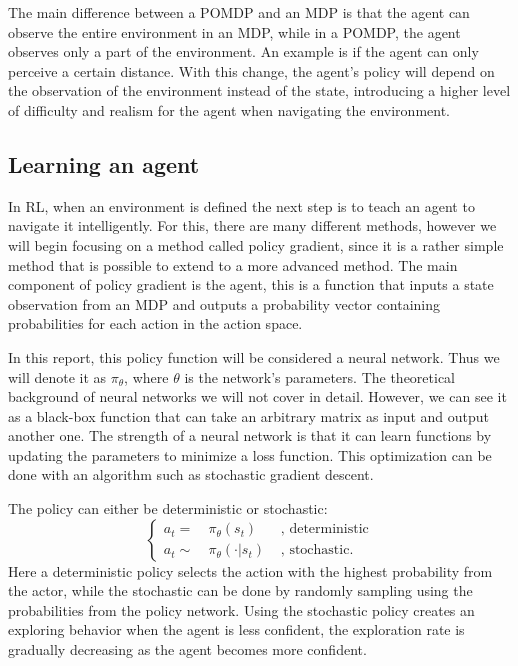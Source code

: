 \documentclass[12pt,A4]{report}
\theoremstyle{definition}
\begin{document}
The main difference between a POMDP and an MDP is that the agent can observe the entire environment in an MDP, while in a POMDP, the agent observes only a part of the environment. An example is if the agent can only perceive a certain distance. With this change, the agent's policy will depend on the observation of the environment instead of the state, introducing a higher level of difficulty and realism for the agent when navigating the environment. 


\subsection{Learning an agent}

In RL, when an environment is defined the next step is to teach an agent to navigate it intelligently. For this, there are many different methods, however we will begin focusing on a method called policy gradient, since it is a rather simple method that is possible to extend to a more advanced method. The main component of policy gradient is the agent, this is a function that inputs a state observation from an MDP and outputs a probability vector containing probabilities for each action in the action space. 

In this report, this policy function will be considered a neural network. Thus we will denote it as $\pi_\theta$, where $\theta$ is the network's parameters. The theoretical background of neural networks we will not cover in detail. However, we can see it as a black-box function that can take an arbitrary matrix as input and output another one. The strength of a neural network is that it can learn functions by updating the parameters to minimize a loss function. This optimization can be done with an algorithm such as stochastic gradient descent.  

The policy can either be deterministic or stochastic:
\begin{equation*}
  \left\{ 
  \begin{aligned}
    a_t =& \ \pi_\theta(s_t)& \text{ , deterministic} \\
    a_t \sim& \ \pi_\theta(\cdot | s_t)& \text{ , stochastic}.
  \end{aligned}
  \right.
\end{equation*}
Here a deterministic policy selects the action with the highest probability from the actor, while the stochastic can be done by randomly sampling using the probabilities from the policy network. Using the stochastic policy creates an exploring behavior when the agent is less confident, the exploration rate is gradually decreasing as the agent becomes more confident.
\end{document}
